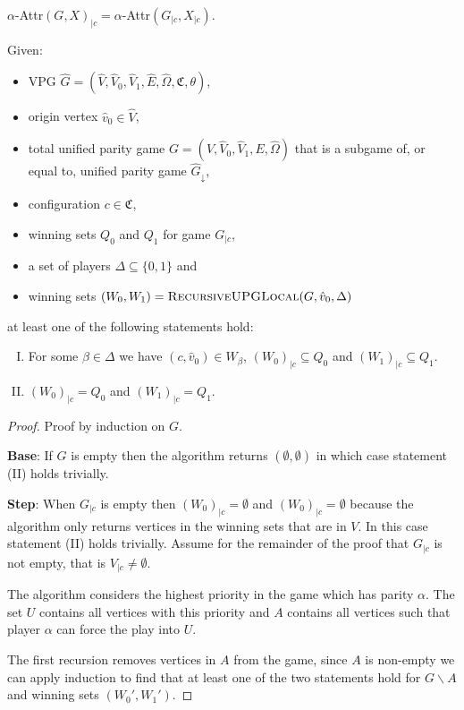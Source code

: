 \begin{lemma}
	\label{lem_projected_attr_is_attr_of_projected}
	$\alpha$-Attr$(G,X)_{|c}= \alpha$-Attr$(G_{|c},X_{|c})$.
\end{lemma}
\begin{theorem}
	Given:
	\begin{itemize}
		\item VPG $\hat{G} = (\hat{V}, \hat{V}_0,\hat{V}_1,\hat{E},\hat{\Omega},\mathfrak{C},\theta)$,
		\item origin vertex $\hat{v}_0 \in \hat{V}$,
		\item total unified parity game $G = (V, \hat{V}_0, \hat{V}_1,E,\hat{\Omega})$ that is a subgame of, or equal to, unified parity game $\hat{G}_{\downarrow}$,
		\item configuration $c\in \mathfrak{C}$,
		\item winning sets $Q_0$ and $Q_1$ for game $G_{|c}$,
		\item a set of players $\Delta \subseteq \{0,1\}$ and
		\item winning sets $(W_0, W_1) = \textsc{RecursiveUPGLocal}(G,\hat{v}_0,\Delta)$
	\end{itemize}
	at least one of the following statements hold:
	\begin{enumerate}[(I)]
		\item For some $\beta \in \Delta$ we have $(c,\hat{v}_0) \in W_\beta$, $(W_0)_{|c} \subseteq Q_0$ and $(W_1)_{|c} \subseteq Q_1$.
		\item $(W_0)_{|c} = Q_0$ and $(W_1)_{|c} = Q_1$.
	\end{enumerate}
	\begin{proof}
		Proof by induction on $G$.
		
		\textbf{Base}: If $G$ is empty then the algorithm returns $(\emptyset,\emptyset)$ in which case statement (II) holds trivially.
		
		\textbf{Step}:
		When $G_{|c}$ is empty then $(W_0)_{|c} = \emptyset$ and $(W_0)_{|c} = \emptyset$ because the algorithm only returns vertices in the winning sets that are in $V$. In this case statement (II) holds trivially. Assume for the remainder of the proof that $G_{|c}$ is not empty, that is $V_{|c} \neq \emptyset$.
		
		The algorithm considers the highest priority in the game which has parity $\alpha$. The set $U$ contains all vertices with this priority and $A$ contains all vertices such that player $\alpha$ can force the play into $U$.
		
		The first recursion removes vertices in $A$ from the game, since $A$ is non-empty we can apply induction to find that at least one of the two statements hold for $G\backslash A$ and winning sets $(W_0',W_1')$.
		

\end{proof}
\end{theorem}
